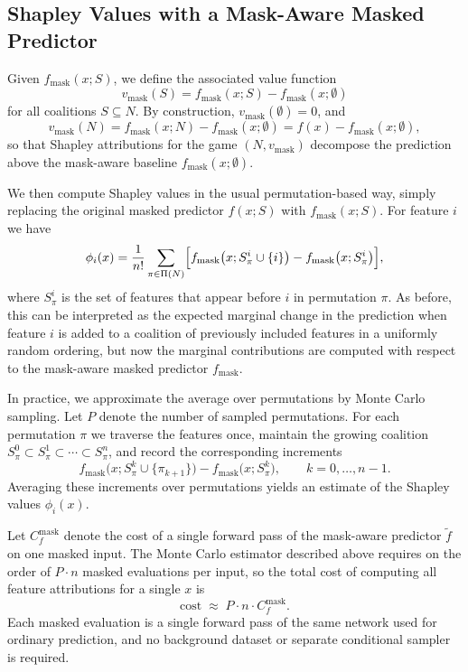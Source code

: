 \documentclass{article}
\begin{document}
\subsection{Shapley Values with a Mask-Aware Masked Predictor}

Given $f_{\text{mask}}(x; S)$, we define the associated value function
\[
v_{\text{mask}}(S) = f_{\text{mask}}(x; S) - f_{\text{mask}}(x; \emptyset)
\]
for all coalitions $S \subseteq N$.
By construction, $v_{\text{mask}}(\emptyset) = 0$, and
\[
v_{\text{mask}}(N)
= f_{\text{mask}}(x; N) - f_{\text{mask}}(x; \emptyset)
= f(x) - f_{\text{mask}}(x; \emptyset),
\]
so that Shapley attributions for the game $(N, v_{\text{mask}})$ decompose the prediction above the mask-aware baseline $f_{\text{mask}}(x; \emptyset)$.

We then compute Shapley values in the usual permutation-based way, simply replacing the original masked predictor $f(x; S)$ with $f_{\text{mask}}(x; S)$.
For feature $i$ we have
\[
\phi_i(x)
= \frac{1}{n!} \sum_{\pi \in \Pi(N)}
\Bigl[
  f_{\text{mask}}\bigl(x; S_\pi^i \cup \{i\}\bigr)
  - f_{\text{mask}}\bigl(x; S_\pi^i\bigr)
\Bigr],
\]
where $S_\pi^i$ is the set of features that appear before $i$ in permutation $\pi$.
As before, this can be interpreted as the expected marginal change in the prediction when feature $i$ is added to a coalition of previously included features in a uniformly random ordering, but now the marginal contributions are computed with respect to the mask-aware masked predictor $f_{\text{mask}}$.

In practice, we approximate the average over permutations by Monte Carlo sampling.
Let $P$ denote the number of sampled permutations.
For each permutation $\pi$ we traverse the features once, maintain the growing coalition $S_\pi^0 \subset S_\pi^1 \subset \cdots \subset S_\pi^n$, and record the corresponding increments
\[
f_{\text{mask}}\bigl(x; S_\pi^{k} \cup \{\pi_{k+1}\}\bigr)
  - f_{\text{mask}}\bigl(x; S_\pi^{k}\bigr),
\qquad k = 0,\dots,n-1.
\]
Averaging these increments over permutations yields an estimate of the Shapley values $\phi_i(x)$.

Let $C_f^{\text{mask}}$ denote the cost of a single forward pass of the mask-aware predictor $\tilde f$ on one masked input.
The Monte Carlo estimator described above requires on the order of $P \cdot n$ masked evaluations per input, so the total cost of computing all feature attributions for a single $x$ is
\[
\text{cost} \;\approx\; P \cdot n \cdot C_f^{\text{mask}}.
\]
Each masked evaluation is a single forward pass of the same network used for ordinary prediction, and no background dataset or separate conditional sampler is required.
\end{document}
